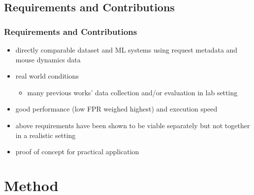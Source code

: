 \documentclass[t,aspectratio=169,table]{beamer}
\begin{document}
\subsection{Requirements and Contributions}
\begin{frame}
\frametitle{Requirements and Contributions}

\begin{itemize}
    \item directly comparable dataset and ML systems using request metadata and mouse dynamics data
    \item real world conditions
    \begin{itemize}
        \item many previous works' data collection and/or evaluation in lab setting
    \end{itemize}
    \item good performance (low FPR weighed highest) and execution speed
    \item above requirements have been shown to be viable separately but not together in a realistic setting
    \item proof of concept for practical application
\end{itemize}

\end{frame}

\section{Method}
\end{document}
